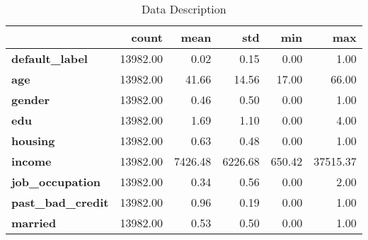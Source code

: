 \begin{table}[centering]
\caption{Data Description}
\label{tab:data_description}
\begin{tabular}{lrrrrr}
\toprule
 & count & mean & std & min & max \\
\midrule
\textbf{default\_label} & 13982.00 & 0.02 & 0.15 & 0.00 & 1.00 \\
\textbf{age} & 13982.00 & 41.66 & 14.56 & 17.00 & 66.00 \\
\textbf{gender} & 13982.00 & 0.46 & 0.50 & 0.00 & 1.00 \\
\textbf{edu} & 13982.00 & 1.69 & 1.10 & 0.00 & 4.00 \\
\textbf{housing} & 13982.00 & 0.63 & 0.48 & 0.00 & 1.00 \\
\textbf{income} & 13982.00 & 7426.48 & 6226.68 & 650.42 & 37515.37 \\
\textbf{job\_occupation} & 13982.00 & 0.34 & 0.56 & 0.00 & 2.00 \\
\textbf{past\_bad\_credit} & 13982.00 & 0.96 & 0.19 & 0.00 & 1.00 \\
\textbf{married} & 13982.00 & 0.53 & 0.50 & 0.00 & 1.00 \\
\bottomrule
\end{tabular}
\end{table}
